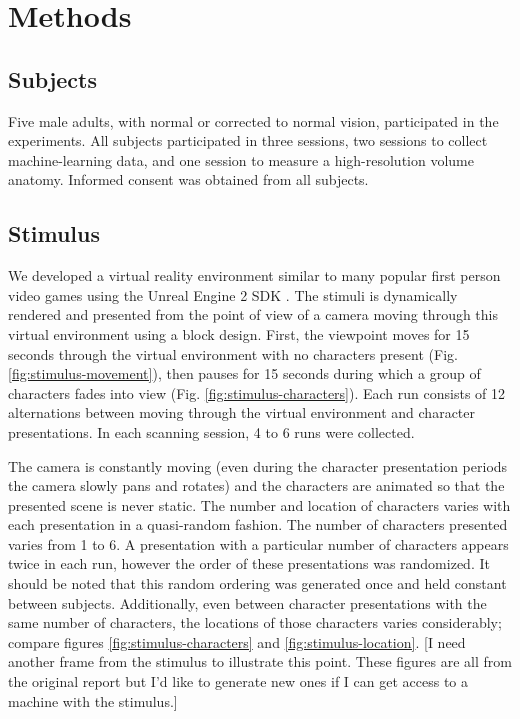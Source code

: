\documentclass[preprint,authoryear,12pt]{elsarticle}
\begin{document}
\section{Methods}

\subsection{Subjects}
Five male adults, with normal or corrected to normal vision, participated in the experiments. 
All subjects participated in three sessions, two sessions to collect machine-learning data, and one session to measure a high-resolution volume anatomy. 
Informed consent was obtained from all subjects.

\subsection{Stimulus}
We developed a virtual reality environment similar to many popular first person video games using the Unreal Engine 2 SDK \citep{UnrealEngine2}.
The stimuli is dynamically rendered and presented from the point of view of a camera moving through this virtual environment using a block design. 
First, the viewpoint moves for 15 seconds through the virtual environment with no characters present (Fig. \ref{fig:stimulus-movement}), then pauses for 15 seconds during which a group of characters fades into view (Fig. \ref{fig:stimulus-characters}). 
Each run consists of 12 alternations between moving through the virtual environment and character presentations. 
In each scanning session, 4 to 6 runs were collected.

The camera is constantly moving (even during the character presentation periods the camera slowly pans and rotates) and the characters are animated so that the presented scene is never static.
The number and location of characters varies with each presentation in a quasi-random fashion.
The number of characters presented varies from 1 to 6.
A presentation with a particular number of characters appears twice in each run, however the order of these presentations was randomized.
It should be noted that this random ordering was generated once and held constant between subjects.
Additionally, even between character presentations with the same number of characters, the locations of those characters varies considerably; compare figures \ref{fig:stimulus-characters} and \ref{fig:stimulus-location}.
[I need another frame from the stimulus to illustrate this point. These figures are all from the original report but I'd like to generate new ones if I can get access to a machine with the stimulus.]
\end{document}
